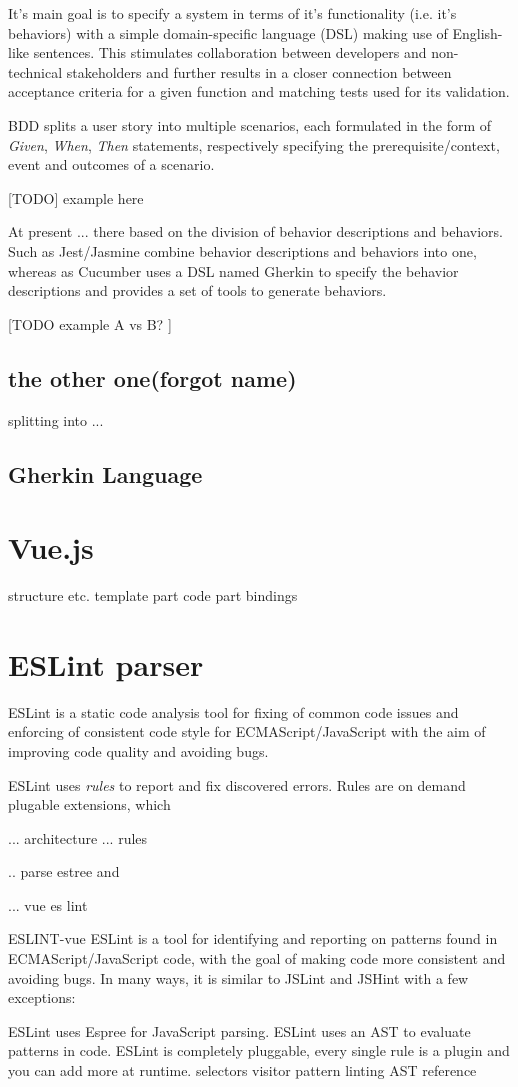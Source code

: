 It's main goal is to specify a system in terms of it's functionality (i.e. it's behaviors) with a simple domain-specific language (DSL) making use of English-like sentences. This stimulates collaboration between developers and non-technical stakeholders and further results in a closer connection between acceptance criteria for a given function and matching tests used for its validation.

BDD splits a user story into multiple scenarios, each formulated in the form of \textit{Given}, \textit{When}, \textit{Then} statements, respectively specifying the prerequisite/context, event and outcomes of a scenario. 

[TODO] example here

At present ... there based on the division of behavior descriptions and behaviors. Such as Jest/Jasmine combine behavior descriptions and behaviors into one, whereas as Cucumber uses a DSL named Gherkin to specify the behavior descriptions and provides a set of tools to generate behaviors. 

[TODO example A vs B? ]


\subsection{the other one(forgot name)}
splitting into ...
\subsection{Gherkin Language}
\section{Vue.js}
structure etc.
template part
code part
bindings

\section{ESLint parser}

ESLint \parencite{eslintMainPage} is a static code analysis tool for fixing of common code issues and enforcing of consistent code style for ECMAScript/JavaScript with the aim of improving code quality and avoiding bugs.


ESLint uses \textit{rules} to report and fix discovered errors. Rules are on demand plugable extensions, which 


... architecture 
... rules


.. parse estree and 

... vue es lint

ESLINT-vue
ESLint is a tool for identifying and reporting on patterns found in ECMAScript/JavaScript code, with the goal of making code more consistent and avoiding bugs. In many ways, it is similar to JSLint and JSHint with a few exceptions:

    ESLint uses Espree for JavaScript parsing.
    ESLint uses an AST to evaluate patterns in code.
    ESLint is completely pluggable, every single rule is a plugin and you can add more at runtime.
selectors
visitor pattern
linting
AST reference
